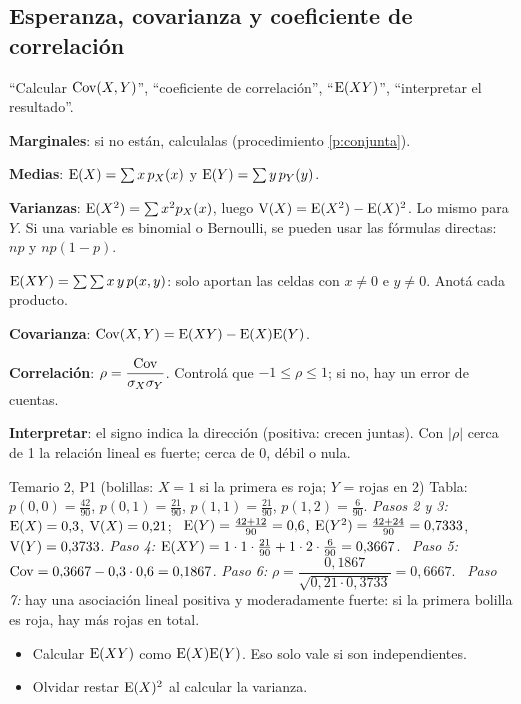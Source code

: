 \subsection{Esperanza, covarianza y coeficiente de correlación}\label{p:cov}
\begin{cuando}
``Calcular $\mathrm{Cov}(X,Y)$'', ``coeficiente de correlación'', ``$\mathrm{E}(XY)$'', ``interpretar el resultado''.
\end{cuando}
\begin{pasos}
\begin{pasolista}
\item \textbf{Marginales}: si no están, calculalas (procedimiento \ref{p:conjunta}).
\item \textbf{Medias}: $\mathrm{E}(X)=\sum x\,p_X(x)$ y $\mathrm{E}(Y)=\sum y\,p_Y(y)$.
\item \textbf{Varianzas}: $\mathrm{E}(X^2)=\sum x^2p_X(x)$, luego $\mathrm{V}(X)=\mathrm{E}(X^2)-\mathrm{E}(X)^2$. Lo mismo para $Y$. Si una variable es binomial o Bernoulli, se pueden usar las fórmulas directas: $np$ y $np(1-p)$.
\item \textbf{$\mathrm{E}(XY)=\sum\sum x\,y\,p(x,y)$}: solo aportan las celdas con $x\neq0$ e $y\neq0$. Anotá cada producto.
\item \textbf{Covarianza}: $\mathrm{Cov}(X,Y)=\mathrm{E}(XY)-\mathrm{E}(X)\mathrm{E}(Y)$.
\item \textbf{Correlación}: $\rho=\dfrac{\mathrm{Cov}}{\sigma_X\sigma_Y}$. Controlá que $-1\le\rho\le1$; si no, hay un error de cuentas.
\item \textbf{Interpretar}: el signo indica la dirección (positiva: crecen juntas). Con $|\rho|$ cerca de 1 la relación lineal es fuerte; cerca de 0, débil o nula.
\end{pasolista}
\end{pasos}
\begin{modelo}{Temario 2, P1 (bolillas: $X=1$ si la primera es roja; $Y$ = rojas en 2)}
Tabla: $p(0,0)=\frac{42}{90}$, $p(0,1)=\frac{21}{90}$, $p(1,1)=\frac{21}{90}$, $p(1,2)=\frac6{90}$.
\emph{Pasos 2 y 3:} $\mathrm{E}(X)=0{,}3$, $\mathrm{V}(X)=0{,}21$; \ $\mathrm{E}(Y)=\frac{42+12}{90}=0{,}6$, $\mathrm{E}(Y^2)=\frac{42+24}{90}=0{,}7333$, $\mathrm{V}(Y)=0{,}3733$.
\emph{Paso 4:} $\mathrm{E}(XY)=1\cdot1\cdot\frac{21}{90}+1\cdot2\cdot\frac{6}{90}=0{,}3667$. \
\emph{Paso 5:} $\mathrm{Cov}=0{,}3667-0{,}3\cdot0{,}6=0{,}1867$.
\emph{Paso 6:} $\rho=\dfrac{0{,}1867}{\sqrt{0{,}21\cdot0{,}3733}}=0{,}6667$. \
\emph{Paso 7:} hay una asociación lineal positiva y moderadamente fuerte: si la primera bolilla es roja, hay más rojas en total.
\end{modelo}
\begin{ojo}
\begin{itemize}
\item Calcular $\mathrm{E}(XY)$ como $\mathrm{E}(X)\mathrm{E}(Y)$. Eso solo vale si son independientes.
\item Olvidar restar $\mathrm{E}(X)^2$ al calcular la varianza.
\end{itemize}
\end{ojo}

